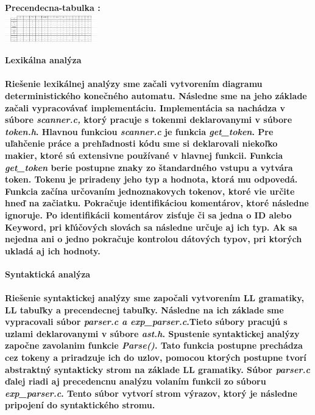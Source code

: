 \documentclass[12pt]{article}
\begin{document}
 \Large \textbf{Precendecna-tabulka :}
\newline \\

\includegraphics[width=0.3\textwidth,scale=0.3]{Ptabulka}


\newpage

 \Large \textbf{Lexikálna analýza} \normalsize \\
\noindent\makebox[\linewidth]{\rule{\textwidth}{0.4pt}}

\paragraph{\indent Riešenie lexikálnej analýzy sme začali vytvorením diagramu deterministického konečného automatu. Následne sme na jeho základe začali vypracovávať implementáciu. Implementácia sa nachádza v súbore \textit{scanner.c,} ktorý pracuje s tokenmi deklarovanymi v súbore \textit{token.h}. Hlavnou funkciou \textit{scanner.c} je funkcia \textit{get\_token}. Pre uľahčenie práce a prehľadnosti kódu sme si deklarovali niekoľko makier, ktoré sú extensivne používané v hlavnej funkcii. Funkcia \textit{get\_token} berie postupne znaky zo štandardného vstupu a vytvára token. Tokenu je priradeny jeho typ a hodnota, ktorá mu odpovedá. Funkcia začína určovaním jednoznakovych tokenov, ktoré vie určite hneď na začiatku. Pokračuje identifikáciou komentárov, ktoré následne ignoruje. Po identifikácii komentárov zisťuje či sa jedna o ID alebo Keyword, pri kľúčových slovách sa následne určuje aj ich typ. Ak sa nejedna ani o jedno pokračuje kontrolou dátových typov, pri ktorých ukladá aj ich hodnoty.  \newline \\}

 \Large \textbf{Syntaktická analýza}\normalsize \\
\noindent\makebox[\linewidth]{\rule{\textwidth}{0.4pt}}

\paragraph{Riešenie syntaktickej analýzy sme započali vytvorením LL gramatiky, LL tabuľky a precendecnej tabuľky. Následne na ich základe sme vypracovali súbor \textit{parser.c a exp\_parser.c}.Tieto súbory pracujú s uzlami deklarovanymi v súbore \textit{ast.h}. Spustenie syntaktickej analýzy započne zavolanim funkcie \textit{Parse()}. Tato funkcia postupne prechádza cez tokeny a priradzuje ich do uzlov, pomocou ktorých postupne tvorí abstraktný syntakticky strom na základe LL gramatiky. Súbor \textit{parser.c} ďalej riadi aj precedencnu analýzu volaním funkcii zo súboru \textit{exp\_parser.c}. Tento súbor vytvorí strom výrazov, ktorý je následne pripojení do syntaktického stromu.  \newline \\}
\end{document}
